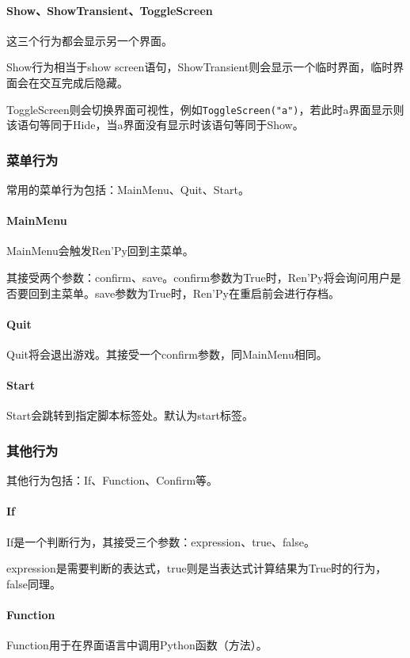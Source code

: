 \documentclass[../../Main.tex]{subfiles}
\begin{document}
\paragraph{Show、ShowTransient、ToggleScreen}
这三个行为都会显示另一个界面。

Show行为相当于show screen语句，ShowTransient则会显示一个临时界面，临时界面会在交互完成后隐藏。

ToggleScreen则会切换界面可视性，例如\verb|ToggleScreen("a")|，若此时a界面显示则该语句等同于Hide，当a界面没有显示时该语句等同于Show。

\subsubsection{菜单行为}
常用的菜单行为包括：MainMenu、Quit、Start。
\paragraph{MainMenu}
MainMenu会触发Ren'Py回到主菜单。

其接受两个参数：confirm、save。confirm参数为True时，Ren'Py将会询问用户是否要回到主菜单。save参数为True时，Ren'Py在重启前会进行存档。

\paragraph{Quit}
Quit将会退出游戏。其接受一个confirm参数，同MainMenu相同。

\paragraph{Start}
Start会跳转到指定脚本标签处。默认为start标签。

\subsubsection{其他行为}
其他行为包括：If、Function、Confirm等。
\paragraph{If}
If是一个判断行为，其接受三个参数：expression、true、false。

expression是需要判断的表达式，true则是当表达式计算结果为True时的行为，false同理。

\paragraph{Function}
Function用于在界面语言中调用Python函数（方法）。
\end{document}
